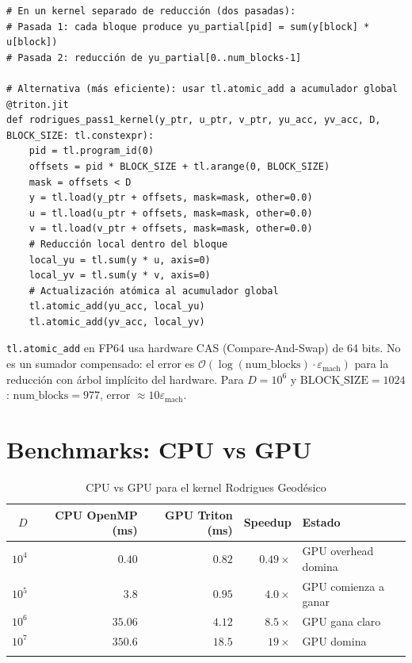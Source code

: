 \begin{lstlisting}[style=pythonstyle, caption={Reducción cruzada de bloques en Triton}, label=lst:triton_reduction]
# En un kernel separado de reducción (dos pasadas):
# Pasada 1: cada bloque produce yu_partial[pid] = sum(y[block] * u[block])
# Pasada 2: reducción de yu_partial[0..num_blocks-1]

# Alternativa (más eficiente): usar tl.atomic_add a acumulador global
@triton.jit
def rodrigues_pass1_kernel(y_ptr, u_ptr, v_ptr, yu_acc, yv_acc, D, BLOCK_SIZE: tl.constexpr):
    pid = tl.program_id(0)
    offsets = pid * BLOCK_SIZE + tl.arange(0, BLOCK_SIZE)
    mask = offsets < D
    y = tl.load(y_ptr + offsets, mask=mask, other=0.0)
    u = tl.load(u_ptr + offsets, mask=mask, other=0.0)
    v = tl.load(v_ptr + offsets, mask=mask, other=0.0)
    # Reducción local dentro del bloque
    local_yu = tl.sum(y * u, axis=0)
    local_yv = tl.sum(y * v, axis=0)
    # Actualización atómica al acumulador global
    tl.atomic_add(yu_acc, local_yu)
    tl.atomic_add(yv_acc, local_yv)
\end{lstlisting}

\begin{remark}
\texttt{tl.atomic\_add} en FP64 usa hardware CAS (Compare-And-Swap) de 64 bits.
No es un sumador compensado: el error es $\mathcal{O}(\log(\text{num\_blocks}) \cdot \varepsilon_{\text{mach}})$
para la reducción con árbol implícito del hardware. Para $D = 10^6$ y
$\text{BLOCK\_SIZE} = 1024$: $\text{num\_blocks} = 977$, error $\approx 10\varepsilon_{\text{mach}}$.
\end{remark}

\section{Benchmarks: CPU vs GPU}

\begin{longtable}{rrrrl}
\toprule
$D$ & CPU OpenMP (ms) & GPU Triton (ms) & Speedup & Estado \\
\midrule
$10^4$   & $0.40$   & $0.82$  & $0.49\times$ & GPU overhead domina \\
$10^5$   & $3.8$    & $0.95$  & $4.0\times$  & GPU comienza a ganar \\
$10^6$   & $35.06$  & $4.12$  & $8.5\times$  & GPU gana claro \\
$10^7$   & $350.6$  & $18.5$  & $19\times$   & GPU domina \\
\bottomrule
\caption{CPU vs GPU para el kernel Rodrigues Geodésico}
\label{tab:cpu_gpu_rodrigues}
\end{longtable}

